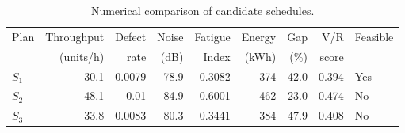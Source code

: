 \begin{table}[htbp]
\centering
\caption{Numerical comparison of candidate schedules.}
\label{tab:numerical-sim}
\small
\begin{tabular}{@{}lrrrrrrrl@{}}
\toprule
Plan & Throughput & Defect & Noise & Fatigue & Energy & Gap & V/R & Feasible \\
     & (units/h)  & rate   & (dB)  & Index   & (kWh)  & (\%) & score &         \\
\midrule
$S_{1}$ & 30.1 & 0.0079 & 78.9 & 0.3082 & 374 & 42.0 & 0.394 & Yes \\
$S_{2}$ & 48.1 & 0.01 & 84.9 & 0.6001 & 462 & 23.0 & 0.474 & No \\
$S_{3}$ & 33.8 & 0.0083 & 80.3 & 0.3441 & 384 & 47.9 & 0.408 & No \\
\bottomrule
\end{tabular}
\end{table}
